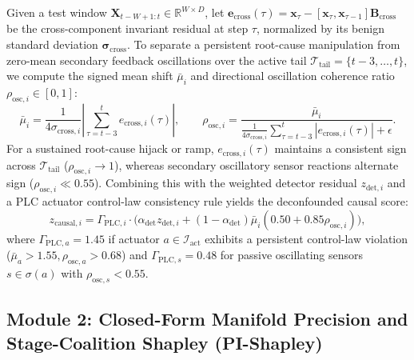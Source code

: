 \documentclass[10pt,a4paper]{article}
\begin{document}
Given a test window $\mathbf{X}_{t-W+1:t} \in \mathbb{R}^{W \times D}$, let $\mathbf{e}_{\text{cross}}(\tau) = \mathbf{x}_\tau - [\mathbf{x}_\tau, \mathbf{x}_{\tau-1}]\mathbf{B}_{\text{cross}}$ be the cross-component invariant residual at step $\tau$, normalized by its benign standard deviation $\boldsymbol{\sigma}_{\text{cross}}$. To separate a persistent root-cause manipulation from zero-mean secondary feedback oscillations over the active tail $\mathcal{T}_{\text{tail}} = \{t-3, \dots, t\}$, we compute the signed mean shift $\bar{\mu}_i$ and directional oscillation coherence ratio $\rho_{\text{osc},i} \in [0, 1]$:
\begin{equation}\label{eq:causal_decouple}
    \bar{\mu}_i = \frac{1}{4\sigma_{\text{cross},i}} \left|\sum_{\tau=t-3}^{t} e_{\text{cross},i}(\tau)\right|, \qquad
    \rho_{\text{osc},i} = \frac{\bar{\mu}_i}{\frac{1}{4\sigma_{\text{cross},i}}\sum_{\tau=t-3}^{t} |e_{\text{cross},i}(\tau)| + \epsilon}.
\end{equation}
For a sustained root-cause hijack or ramp, $e_{\text{cross},i}(\tau)$ maintains a consistent sign across $\mathcal{T}_{\text{tail}}$ ($\rho_{\text{osc},i} \to 1$), whereas secondary oscillatory sensor reactions alternate sign ($\rho_{\text{osc},i} \ll 0.55$). Combining this with the weighted detector residual $z_{\text{det},i}$ and a PLC actuator control-law consistency rule yields the deconfounded causal score:
\begin{equation}\label{eq:z_causal}
    z_{\text{causal},i} = \Gamma_{\text{PLC},i} \cdot \Big(\alpha_{\text{det}} z_{\text{det},i} + (1 - \alpha_{\text{det}}) \bar{\mu}_i (0.50 + 0.85 \rho_{\text{osc},i})\Big),
\end{equation}
where $\Gamma_{\text{PLC},a} = 1.45$ if actuator $a \in \mathcal{I}_{\text{act}}$ exhibits a persistent control-law violation ($\bar{\mu}_a > 1.55, \rho_{\text{osc},a} > 0.68$) and $\Gamma_{\text{PLC},s} = 0.48$ for passive oscillating sensors $s \in \sigma(a)$ with $\rho_{\text{osc},s} < 0.55$.

\subsection{Module 2: Closed-Form Manifold Precision and Stage-Coalition Shapley (PI-Shapley)}
\end{document}
